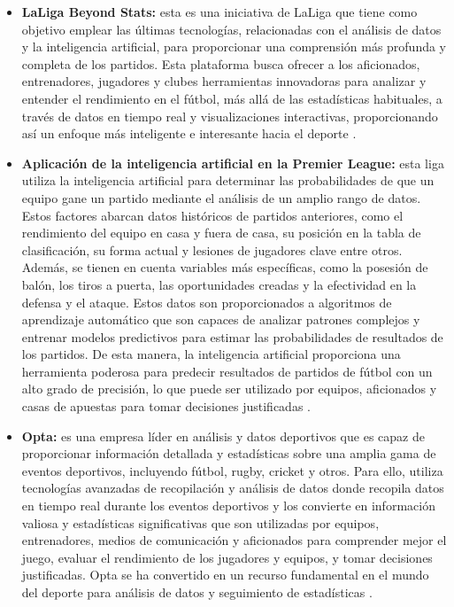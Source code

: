 \begin{itemize}
\item \textbf{LaLiga Beyond Stats:}
esta es una iniciativa de LaLiga que tiene como objetivo emplear las últimas tecnologías, relacionadas con el análisis de datos y la inteligencia artificial, para proporcionar una comprensión más profunda y completa de los partidos. Esta plataforma busca ofrecer a los aficionados, entrenadores, jugadores y clubes herramientas innovadoras para analizar y entender el rendimiento en el fútbol, más allá de las estadísticas habituales, a través de datos en tiempo real y visualizaciones interactivas, proporcionando así un enfoque más inteligente e interesante hacia el deporte \cite{beyondstats}.

\item \textbf{Aplicación de la inteligencia artificial en la Premier League:}
esta liga utiliza la inteligencia artificial para determinar las probabilidades de que un equipo gane un partido mediante el análisis de un amplio rango de datos. Estos factores abarcan datos históricos de partidos anteriores, como el rendimiento del equipo en casa y fuera de casa, su posición en la tabla de clasificación, su forma actual y lesiones de jugadores clave entre otros. Además, se tienen en cuenta variables más específicas, como la posesión de balón, los tiros a puerta, las oportunidades creadas y la efectividad en la defensa y el ataque. Estos datos son proporcionados a algoritmos de aprendizaje automático que son capaces de analizar patrones complejos y entrenar modelos predictivos para estimar las probabilidades de resultados de los partidos. De esta manera, la inteligencia artificial proporciona una herramienta poderosa para predecir resultados de partidos de fútbol con un alto grado de precisión, lo que puede ser utilizado por equipos, aficionados y casas de apuestas para tomar decisiones justificadas \cite{oracle} \cite{iaFutbol}.

\item \textbf{Opta:}
es una empresa líder en análisis y datos deportivos que es capaz de proporcionar información detallada y estadísticas sobre una amplia gama de eventos deportivos, incluyendo fútbol, rugby, cricket y otros. Para ello, utiliza tecnologías avanzadas de recopilación y análisis de datos donde recopila datos en tiempo real durante los eventos deportivos y los convierte en información valiosa y estadísticas significativas que son utilizadas por equipos, entrenadores, medios de comunicación y aficionados para comprender mejor el juego, evaluar el rendimiento de los jugadores y equipos, y tomar decisiones justificadas. Opta se ha convertido en un recurso fundamental en el mundo del deporte para análisis de datos y seguimiento de estadísticas \cite{opta}.

\end{itemize}

















